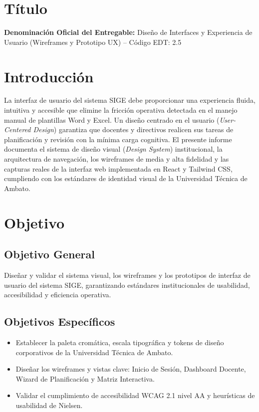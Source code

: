 \documentclass[12pt,a4paper]{article}
\begin{document}
\section{Título}
\textbf{Denominación Oficial del Entregable:} Diseño de Interfaces y Experiencia de Usuario (Wireframes y Prototipo UX) -- Código EDT: 2.5

\section{Introducción}
La interfaz de usuario del sistema SIGE debe proporcionar una experiencia fluida, intuitiva y accesible que elimine la fricción operativa detectada en el manejo manual de plantillas Word y Excel. Un diseño centrado en el usuario (\textit{User-Centered Design}) garantiza que docentes y directivos realicen sus tareas de planificación y revisión con la mínima carga cognitiva. El presente informe documenta el sistema de diseño visual (\textit{Design System}) institucional, la arquitectura de navegación, los wireframes de media y alta fidelidad y las capturas reales de la interfaz web implementada en React y Tailwind CSS, cumpliendo con los estándares de identidad visual de la Universidad Técnica de Ambato.

\section{Objetivo}
\subsection{Objetivo General}
Diseñar y validar el sistema visual, los wireframes y los prototipos de interfaz de usuario del sistema SIGE, garantizando estándares institucionales de usabilidad, accesibilidad y eficiencia operativa.
\subsection{Objetivos Específicos}
\begin{itemize}[leftmargin=1.5em, itemsep=2pt]
    \item Establecer la paleta cromática, escala tipográfica y tokens de diseño corporativos de la Universidad Técnica de Ambato.
    \item Diseñar los wireframes y vistas clave: Inicio de Sesión, Dashboard Docente, Wizard de Planificación y Matriz Interactiva.
    \item Validar el cumplimiento de accesibilidad WCAG 2.1 nivel AA y heurísticas de usabilidad de Nielsen.
\end{itemize}
\end{document}
